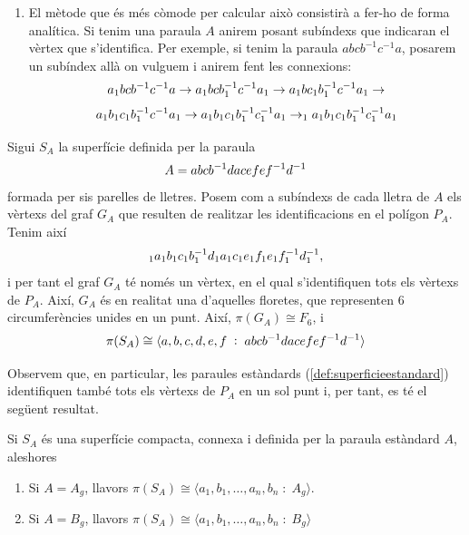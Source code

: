 \documentclass[../main.tex]{subfiles}
\begin{document}
\begin{enumerate}
    \item El mètode que és més còmode per calcular això consistirà a fer-ho de forma analítica. Si tenim una paraula $A$ anirem posant subíndexs que indicaran el vèrtex que s'identifica. Per exemple, si tenim la paraula $abcb^{-1}c^{-1}a$, posarem un subíndex allà on vulguem i anirem fent les connexions:
    \begin{equation}
        \notag
        a_1bcb^{-1}c^{-1}a\rightarrow a_1bcb^{-1}_1c^{-1}a_1 \rightarrow a_1bc_1b^{-1}_1c^{-1}a_1 \rightarrow
    \end{equation}
    \begin{equation}
        \notag
         a_1b_1c_1b^{-1}_1c^{-1}a_1 \rightarrow a_1b_1c_1b^{-1}_1c^{-1}_1a_1 \rightarrow
        _1a_1b_1c_1b^{-1}_1c^{-1}_1a_1
    \end{equation}
\end{enumerate}

\begin{ej}
Sigui $S_A$ la superfície definida per la paraula
\begin{equation}
    \notag
    A = abcb^{-1}dacefef^{-1}d^{-1}
\end{equation}
formada per sis parelles de lletres. Posem com a subíndexs de cada lletra de $A$ els vèrtexs del graf $G_A$ que resulten de realitzar les identificacions en el polígon $P_A$. Tenim així
\begin{equation}
    \notag
    _1a_1b_1c_1b^{-1}_1d_1a_1c_1e_1f_1e_1f^{-1}_1d^{-1}_1,
\end{equation}
i per tant el graf $G_A$ té només un vèrtex, en el qual s'identifiquen tots els vèrtexs de $P_A$. Així, $G_A$ és en realitat una d'aquelles floretes, que representen 6 circumferències unides en un punt. Així, $\pi(G_A)\cong F_6$, i 
\begin{equation}
    \notag
    \pi(S_A)\cong \langle a,b,c,d,e,f\;:\;abcb^{-1}dacefef^{-1}d^{-1}\rangle
\end{equation}
\end{ej}

Observem que, en particular, les paraules estàndards (\ref{def:superficieestandard}) identifiquen també tots els vèrtexs de $P_A$ en un sol punt i, per tant, es té el següent resultat.
\begin{coro}
Si $S_A$ és una superfície compacta, connexa i definida per la paraula estàndard $A$, aleshores
\begin{enumerate}
    \item Si $A = A_g$, llavors $\pi(S_A)\cong\langle a_1,b_1,\ldots,a_n,b_n\;:\;A_g\rangle$.
    \item Si $A = B_g$, llavors $\pi(S_A)\cong\langle a_1,b_1,\ldots,a_n,b_n\;:\;B_g\rangle$
\end{enumerate}
\end{coro}
\end{document}
